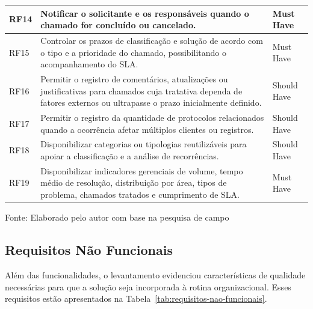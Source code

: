 \begin{table}[H]
\begin{tabular}{p{1.0cm} p{8.7cm} p{2.3cm}}
\hline
RF14 & Notificar o solicitante e os responsáveis quando o
chamado for concluído ou cancelado. & Must Have \\
\hline
RF15 & Controlar os prazos de classificação e solução de
acordo com o tipo e a prioridade do chamado, possibilitando
o acompanhamento do SLA. & Must Have \\
\hline
RF16 & Permitir o registro de comentários, atualizações ou
justificativas para chamados cuja tratativa dependa de
fatores externos ou ultrapasse o prazo inicialmente
definido. & Should Have \\
\hline
RF17 & Permitir o registro da quantidade de protocolos
relacionados quando a ocorrência afetar múltiplos clientes
ou registros. & Should Have \\
\hline
RF18 & Disponibilizar categorias ou tipologias reutilizáveis
para apoiar a classificação e a análise de recorrências. &
Should Have \\
\hline
RF19 & Disponibilizar indicadores gerenciais de volume,
tempo médio de resolução, distribuição por área, tipos de
problema, chamados tratados e cumprimento de SLA. &
Must Have \\
\hline
\end{tabular}
\raggedright
\par
{\fontsize{10}{12}\selectfont Fonte: Elaborado pelo autor
com base na pesquisa de campo}
\end{table}

\subsection{Requisitos Não Funcionais}

Além das funcionalidades, o levantamento evidenciou
características de qualidade necessárias para que a solução
seja incorporada à rotina organizacional. Esses requisitos
estão apresentados na Tabela~\ref{tab:requisitos-nao-funcionais}.

